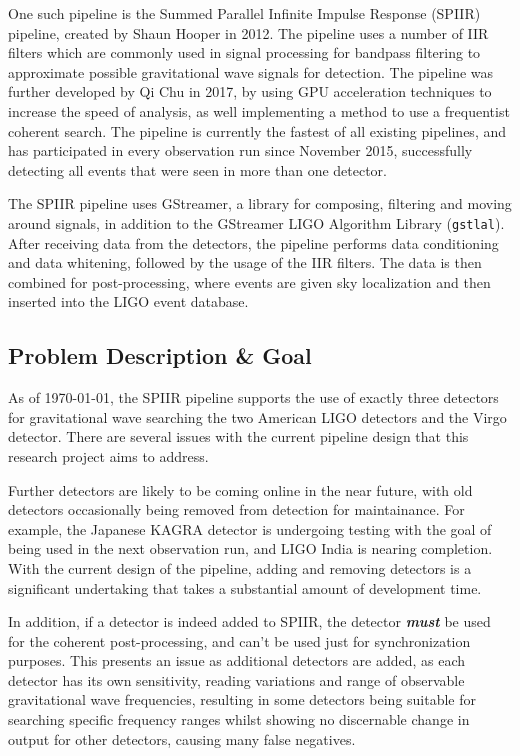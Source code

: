 \documentclass{article}
\begin{document}
One such pipeline is the Summed Parallel Infinite Impulse Response (SPIIR) pipeline, created by
Shaun Hooper in 2012. The pipeline uses a number of IIR filters \textendash{} which are commonly
used in signal processing for bandpass filtering \textendash{} to approximate possible gravitational
wave signals for detection. The pipeline was further developed by Qi Chu in 2017, by using GPU
acceleration techniques to increase the speed of analysis, as well implementing a method to use a
frequentist coherent search. The pipeline is currently the fastest of all existing pipelines, and
has participated in every observation run since November 2015, successfully detecting all events
that were seen in more than one detector.

The SPIIR pipeline uses GStreamer, a library for composing, filtering and moving around signals, in
addition to the GStreamer LIGO Algorithm Library (\texttt{gstlal}). After receiving data from the
detectors, the pipeline performs data conditioning and data whitening, followed by the usage of the
IIR filters. The data is then combined for post-processing, where events are given sky localization
and then inserted into the LIGO event database.

\subsection{Problem Description \& Goal}
As of \today{}, the SPIIR pipeline supports the use of exactly three detectors for gravitational
wave searching \textendash{} the two American LIGO detectors and the Virgo detector. There are
several issues with the current pipeline design that this research project aims to address.

Further detectors are likely to be coming online in the near future, with old detectors occasionally
being removed from detection for maintainance. For example, the Japanese KAGRA detector is
undergoing testing with the goal of being used in the next observation run, and LIGO India is
nearing completion. With the current design of the pipeline, adding and removing detectors is a
significant undertaking that takes a substantial amount of development time.

In addition, if a detector is indeed added to SPIIR, the detector \textit{\textbf{must}} be used for
the coherent post-processing, and can't be used just for synchronization purposes. This presents an
issue as additional detectors are added, as each detector has its own sensitivity, reading
variations and range of observable gravitational wave frequencies, resulting in some detectors being
suitable for searching specific frequency ranges whilst showing no discernable change in output for
other detectors, causing many false negatives.
\end{document}
